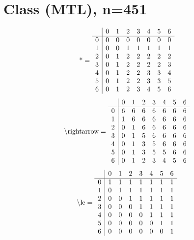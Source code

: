 \documentclass[11pt]{article}
\begin{document}
\section{Class (MTL), n=451}
\[\text{*} = 
\begin{array}{r | r r r r r r r}
 & 0 & 1 & 2 & 3 & 4 & 5 & 6 \\ \hline
0 & 0 & 0 & 0 & 0 & 0 & 0 & 0 \\
1 & 0 & 0 & 1 & 1 & 1 & 1 & 1 \\
2 & 0 & 1 & 2 & 2 & 2 & 2 & 2 \\
3 & 0 & 1 & 2 & 2 & 2 & 2 & 3 \\
4 & 0 & 1 & 2 & 2 & 3 & 3 & 4 \\
5 & 0 & 1 & 2 & 2 & 3 & 3 & 5 \\
6 & 0 & 1 & 2 & 3 & 4 & 5 & 6 \\
\end{array}
\]
\[\text{\textbackslash rightarrow} = 
\begin{array}{r | r r r r r r r}
 & 0 & 1 & 2 & 3 & 4 & 5 & 6 \\ \hline
0 & 6 & 6 & 6 & 6 & 6 & 6 & 6 \\
1 & 1 & 6 & 6 & 6 & 6 & 6 & 6 \\
2 & 0 & 1 & 6 & 6 & 6 & 6 & 6 \\
3 & 0 & 1 & 5 & 6 & 6 & 6 & 6 \\
4 & 0 & 1 & 3 & 5 & 6 & 6 & 6 \\
5 & 0 & 1 & 3 & 5 & 5 & 6 & 6 \\
6 & 0 & 1 & 2 & 3 & 4 & 5 & 6 \\
\end{array}
\]
\[\text{\textbackslash le} = 
\begin{array}{r | r r r r r r r}
 & 0 & 1 & 2 & 3 & 4 & 5 & 6 \\ \hline
0 & 1 & 1 & 1 & 1 & 1 & 1 & 1 \\
1 & 0 & 1 & 1 & 1 & 1 & 1 & 1 \\
2 & 0 & 0 & 1 & 1 & 1 & 1 & 1 \\
3 & 0 & 0 & 0 & 1 & 1 & 1 & 1 \\
4 & 0 & 0 & 0 & 0 & 1 & 1 & 1 \\
5 & 0 & 0 & 0 & 0 & 0 & 1 & 1 \\
6 & 0 & 0 & 0 & 0 & 0 & 0 & 1 \\
\end{array}
\]
\end{document}
